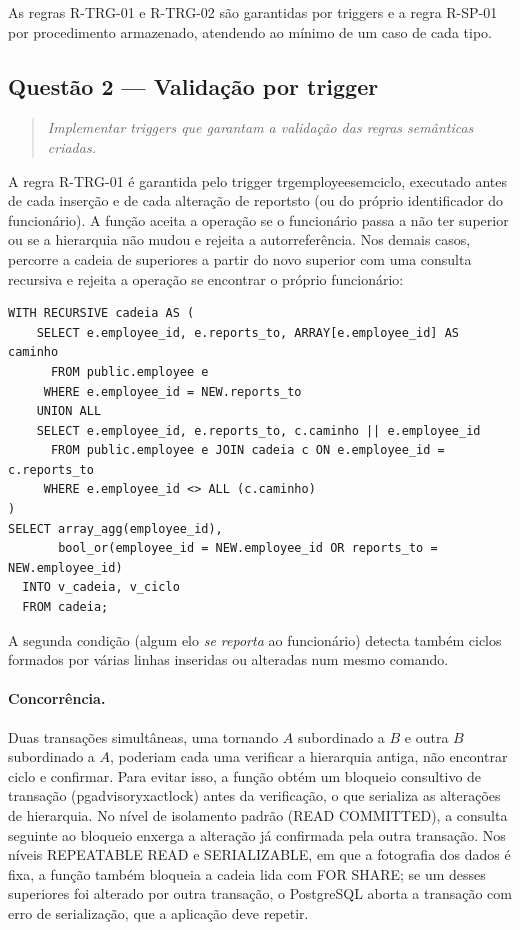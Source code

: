 \documentclass[11pt,a4paper]{article}
\newcommand{\cod}[1]{{\ttfamily\renewcommand{\_}{\textunderscore\allowbreak}#1}}
\newenvironment{enunciado}{\begin{quote}\small\itshape}{\end{quote}}
\begin{document}
As regras R-TRG-01 e R-TRG-02 são garantidas por triggers e a regra R-SP-01 por procedimento armazenado, atendendo ao
mínimo de um caso de cada tipo.

\subsection{Questão 2 --- Validação por trigger}

\begin{enunciado}
Implementar triggers que garantam a validação das regras semânticas criadas.
\end{enunciado}

A regra R-TRG-01 é garantida pelo trigger \cod{trg\_employee\_sem\_ciclo}, executado antes de cada inserção e de
cada alteração de \cod{reports\_to} (ou do próprio identificador do funcionário). A função aceita a operação se o funcionário passa a não ter superior ou se a
hierarquia não mudou e rejeita a autorreferência. Nos demais casos, percorre a cadeia de superiores a partir do
novo superior com uma consulta recursiva e rejeita a operação se encontrar o próprio funcionário:

\begin{lstlisting}
WITH RECURSIVE cadeia AS (
    SELECT e.employee_id, e.reports_to, ARRAY[e.employee_id] AS caminho
      FROM public.employee e
     WHERE e.employee_id = NEW.reports_to
    UNION ALL
    SELECT e.employee_id, e.reports_to, c.caminho || e.employee_id
      FROM public.employee e JOIN cadeia c ON e.employee_id = c.reports_to
     WHERE e.employee_id <> ALL (c.caminho)
)
SELECT array_agg(employee_id),
       bool_or(employee_id = NEW.employee_id OR reports_to = NEW.employee_id)
  INTO v_cadeia, v_ciclo
  FROM cadeia;
\end{lstlisting}

A segunda condição (algum elo \emph{se reporta} ao funcionário) detecta também ciclos formados por várias linhas
inseridas ou alteradas num mesmo comando.

\paragraph{Concorrência.} Duas transações simultâneas, uma tornando $A$ subordinado a $B$ e outra $B$ subordinado
a $A$, poderiam cada uma verificar a hierarquia antiga, não encontrar ciclo e confirmar. Para evitar isso, a
função obtém um bloqueio consultivo de transação (\cod{pg\_advisory\_xact\_lock}) antes da verificação, o que
serializa as alterações de hierarquia. No nível de isolamento padrão (\cod{READ COMMITTED}), a consulta seguinte
ao bloqueio enxerga a alteração já confirmada pela outra transação. Nos níveis \cod{REPEATABLE READ} e
\cod{SERIALIZABLE}, em que a fotografia dos dados é fixa, a função também bloqueia a cadeia lida com
\cod{FOR SHARE}; se um desses superiores foi alterado por outra transação, o PostgreSQL aborta a transação com
erro de serialização, que a aplicação deve repetir.
\end{document}
